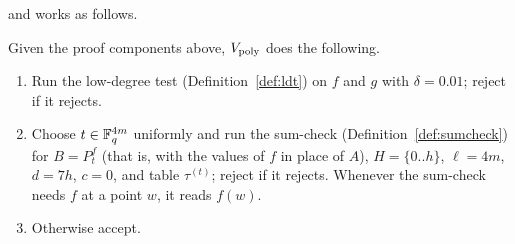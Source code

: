 \noindent
and works as follows.

\begin{definition}
Given the proof components above, $V_{\rm poly}$ does the following.
\begin{enumerate}
  \item Run the low-degree test (Definition~\ref{def:ldt}) on $f$ and $g$ with $\delta=0.01$; reject if it rejects.
  \item Choose $t\in\mathbb{F}_q^{4m}$ uniformly and run the sum-check (Definition~\ref{def:sumcheck}) for $B=P^{f}_t$ (that is, with the values of $f$ in place of $A$), $H=\{0..h\}$, $\ell=4m$, $d=7h$, $c=0$, and table $\tau^{(t)}$;
        reject if it rejects.  Whenever the sum-check needs $f$ at a point $w$, it reads $f(w)$.
  \item Otherwise accept.
\end{enumerate}
\end{definition}

